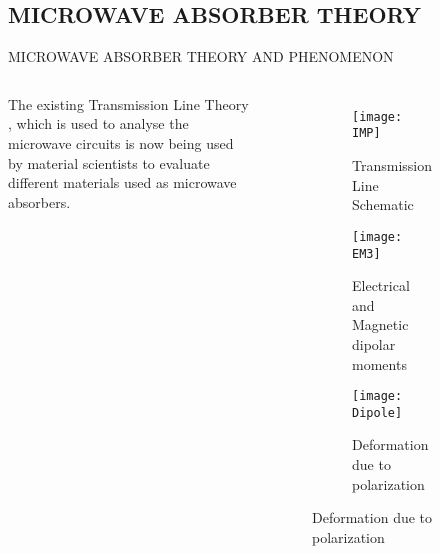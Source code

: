 \documentclass[11pt,aspect ratio=169]{beamer}
\begin{document}
\subsection{MICROWAVE ABSORBER THEORY}
\begin{frame}[t,allowframebreaks]{MICROWAVE ABSORBER THEORY AND PHENOMENON}
	\begin{columns}
		
		\tiny  The existing Transmission Line Theory , which is used to analyse the microwave circuits is now being used by material scientists to evaluate different materials used as microwave absorbers. 
		
		\begin{figure}[ht,scale=0.5]
			\begin{subfigure}{0.8\textwidth}
				\tiny
				\texttt{[image: IMP]}
				\caption{\tiny Transmission Line Schematic}
				\label{fig:imp}
			\end{subfigure}
			\begin{subfigure}{0.8\textwidth}
				\tiny
				\texttt{[image: EM3]}
				\caption{\tiny Electrical and Magnetic dipolar moments\cite{r12}}
				\label{fig:em3}
			\end{subfigure}
			\begin{subfigure}{0.8\textwidth}
				\tiny
				\texttt{[image: Dipole]}
				\caption{\tiny Deformation due to polarization\cite{r11}}
				\label{fig:dipole}
			\end{subfigure}
		\end{figure}
		

\end{columns}
\end{frame}
\end{document}
